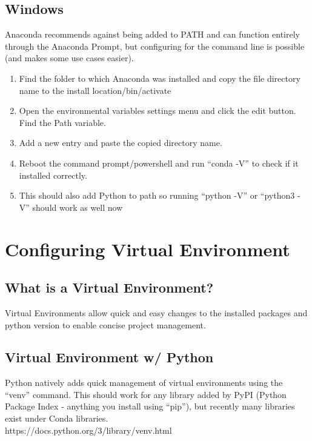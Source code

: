 \documentclass[12pt]{article}
\begin{document}
        \subsection{Windows}
            Anaconda recommends against being added to PATH and can function entirely through the Anaconda Prompt,
            but configuring for the command line is possible (and makes some use cases easier).
            \begin{enumerate}
                \item Find the folder to which Anaconda was installed and copy the file directory name to the \textlangle install location\textrangle /bin/activate
                \item Open the environmental variables settings menu and click the edit button. Find the Path variable.
                \item Add a new entry and paste the copied directory name.
                \item Reboot the command prompt/powershell and run “conda -V” to check if it installed correctly.
                \item This should also add Python to path so running “python -V” or “python3 -V” should work as well now
            \end{enumerate}
    \section{Configuring Virtual Environment}
        \subsection{What is a Virtual Environment?}
            Virtual Environments allow quick and easy changes to the installed packages and python version to enable concise project management.
        \subsection{Virtual Environment w/ Python}
            Python natively adds quick management of virtual environments using the “venv” command. This should work for any library added by PyPI (Python Package Index - anything you install using “pip”), but recently many libraries exist under Conda libraries.
            \\https://docs.python.org/3/library/venv.html
\end{document}
